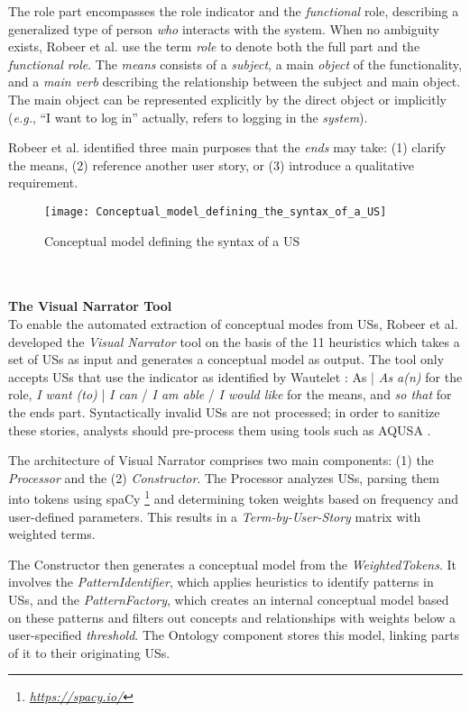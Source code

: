 The role part encompasses the role indicator and the \emph{functional} role, describing a generalized type of person \emph{who} interacts with the system. When no ambiguity exists, Robeer et al. use the term \emph{role} to denote both the full part and the \emph{functional role}. The \emph{means} consists of a \emph{subject}, a main \emph{object} of the functionality, and a \emph{main verb} describing the relationship between the subject and main object. The main object can be represented explicitly by the direct object or implicitly (\emph{e.g.}, \enquote{I want to log in} actually, refers to logging in the \emph{system}).

Robeer et al. identified three main purposes that the \emph{ends} may take: (1) clarify the means, (2) reference another user story, or (3) introduce a qualitative requirement.
\begin{figure}
\center
\texttt{[image: Conceptual\_model\_defining\_the\_syntax\_of\_a\_US]}
\caption{Conceptual model defining the syntax of a US  \cite{Robeer2016}}\label{fig:cmd}
\end{figure} \\  \\ 
\textbf{The Visual Narrator Tool}\\
To enable the automated extraction of conceptual modes from USs, Robeer et al. developed the \emph{Visual Narrator} tool on the basis of the 11 heuristics \cite{Robeer2016} which takes a set of USs as input and generates a conceptual model as output. The tool only accepts USs that use the indicator as identified by Wautelet \cite{Wautelet2014}: As | \emph{As a(n)} for the role, \emph{I want (to)} | \emph{I can} / \emph{I am able} / \emph{I would like} for the means, and \emph{so that} for the ends part. Syntactically invalid USs are not processed; in order to sanitize these stories, analysts should pre-process them using tools such as AQUSA \cite{lucassen2016improving}.

The architecture of Visual Narrator comprises two main components: (1) the \emph{Processor} and the (2) \emph{Constructor}. The Processor analyzes USs, parsing them into tokens using spaCy \footnote{\href{https://spacy.io/}{\emph{https://spacy.io/}}} and determining token weights based on frequency and user-defined parameters. This results in a \emph{Term-by-User-Story} matrix with weighted terms.

The Constructor then generates a conceptual model from the \emph{WeightedTokens}. It involves the \emph{PatternIdentifier}, which applies heuristics to identify patterns in USs, and the \emph{PatternFactory}, which creates an internal conceptual model based on these patterns and filters out concepts and relationships with weights below a user-specified \emph{threshold}. The Ontology component stores this model, linking parts of it to their originating USs.

